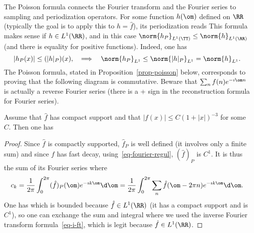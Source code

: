 The Poisson formula connects the Fourier transform and the Fourier series to sampling and periodization operators.
%
For some function $h(\om)$ defined on $\RR$ (typically the goal is to apply this to $h=\hat f$), its periodization reads
This formula makes sense if $h \in L^1(\RR)$, and in this case $\norm{h_P}_{L^1(\TT)} \leq \norm{h}_{L^1(\RR)}$ (and there is equality for positive functions). Indeed, one has
$$
	|h_P(x)| \leq (|h|_P)(x), \quad\Longrightarrow\quad
	\norm{h_P}_{L^1} \leq  \norm{|h|_P}_{L^1} = \norm{h}_{L^1}. 
$$
%
The Poisson formula, stated in Proposition~\ref{prop-poisson} below, corresponds to proving that the following diagram
is commutative. Beware that $\sum_n f(n) e^{-\imath \om n}$ is actually a reverse Fourier series (there is a + sign in the reconstruction formula for Fourier series). 

\begin{prop}\label{prop-poisson}
Assume that $\hat f$ has compact support and that $|f(x)| \leq C(1+|x|)^{-3}$ for some $C$. Then one has 
\end{prop}
\begin{proof}
	Since $\hat f$ is compactly supported, $\hat f_P$ is well defined (it involves only a finite sum) and since $f$ has fast decay, using~\eqref{eq-fourier-regul}, $(\hat f)_P$ is $C^1$. It is thus the sum of its Fourier series
	where
	\begin{align*}
		c_k = \frac{1}{2\pi} \int_0^{2\pi} (\hat f)_P(\om) e^{-\imath k \om} \d \om = 
		\frac{1}{2\pi} \int_0^{2\pi} \sum_n \hat f(\om-2\pi n) e^{-\imath k \om}  \d \om .
	\end{align*}
	One has 
	which is bounded because $\hat f \in L^1(\RR)$ (it has a compact support and is $C^1$), so one can exchange the sum and integral
	where we used the inverse Fourier transform formula~\eqref{eq-i-ft}, which is legit because $\hat f \in L^1(\RR)$.
\end{proof}

